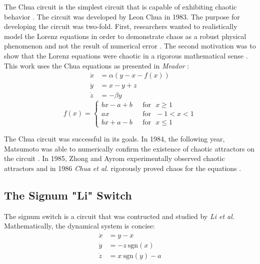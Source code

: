           The Chua circuit is the simplest circuit that is capable of exhibiting chaotic behavior \cite{item:13}.
          The circuit was developed by Leon Chua in 1983. The purpose for developing the circuit was two-fold.
          First, researchers wanted to realistically model the Lorenz equations in order to demonstrate
          chaos as a robust physical phenomenon and not the result of numerical error \cite{item:13}. The second
          motivation was to show that the Lorenz equations were chaotic in a rigorous mathematical sense \cite{item:13}.
          This work uses the Chua equations as presented in \textit{Meador} \cite{item:8}:
          \begin{equation}\label{eq:chua}
              \begin{align}
                  \dot{x}&=\alpha(y-x-f(x))\\
                  \dot{y}&=x-y+z\\
                  \dot{z}&=-\beta y
              \end{align}
          \end{equation}
          \begin{equation}\label{eq:chua1}
              f(x) =
              \begin{cases}
                  bx - a + b \ \ \ &\text{for} \ \ \ x\geq 1\\
                  ax  &\text{for} \ \ \ -1<x<1\\
                  bx + a - b &\text{for} \ \ \ x\leq 1
              \end{cases}
          \end{equation}

          The Chua circuit was successful in its goals.
          In 1984, the following year, Matsumoto was able to numerically confirm the existence of chaotic
          attractors on the circuit \cite{item:13}\cite{item:14}. In 1985, Zhong and Ayrom experimentally observed
          chaotic attractors \cite{item:13}\cite{item:22} and in 1986 \textit{Chua et al.} rigorously proved chaos for
          the equations \cite{item:13}.\\

    \subsection{The Signum "Li" Switch} %

          The signum switch is a circuit that was contructed and studied by \textit{Li et al.}\cite{item:6} Mathematically, the
          dynamical system is concise:
          \begin{equation}\label{eq:signum}
              \begin{align}
                  \dot{x}&=y-x\\
                  \dot{y}&=-z \ \text{sgn}(x)\\
                  \dot{z}&=x \ \text{sgn}(y) - a
              \end{align}
          \end{equation}

